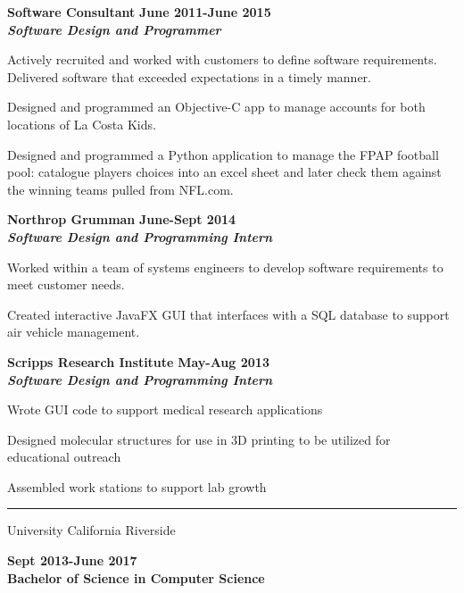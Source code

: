 \documentclass[10pt]{article}
\newcommand{\thing}[1][]{\item #1}
\newcommand{\sectionheader}[1]{
    \vspace{3pt}
    \StrSplit{#1}{3}{\firstpart}{\lastpart} %

    \makebox[0pt][l]{\textbf{\LARGE\firstpart\lastpart}}%
    \rule[-1ex]{\columnwidth}{.1pt}

}
\newcommand{\dates}[2]{
    \textbf{#1-#2}
}
\begin{document}
    \textbf{\large Software Consultant} \hfill \dates{June 2011}{June 2015}\\
    \textit{\textbf{Software Design and Programmer}}
    \begin{things}
        \thing Actively recruited and worked with customers to define
                software requirements. Delivered software that exceeded
                expectations in a timely manner.
        \thing Designed and programmed an Objective-C app to manage
                accounts for both locations of La Costa Kids.
        \thing Designed and programmed a Python application to manage
                the FPAP football pool: catalogue players choices
                into an excel sheet and later check them against the
                winning teams pulled from NFL.com.
    \end{things}

    \textbf{\large Northrop Grumman} \hfill \dates{June}{Sept 2014}\\
    \textit{\textbf{Software Design and Programming Intern}}
    \begin{things}
        \thing Worked within a team of systems engineers to develop
                software requirements to meet customer needs.
        \thing Created interactive JavaFX GUI that interfaces with a
                SQL database to support air vehicle management.
    \end{things}


    \textbf{\large Scripps Research Institute} \hfill \dates{May}{Aug 2013}\\
    \textit{\textbf{Software Design and Programming Intern}}
    \begin{things}
        \thing Wrote GUI code to support medical research applications
        \thing Designed molecular structures for use in 3D printing
                to be utilized for educational outreach
        \thing Assembled work stations to support lab growth
    \end{things}
    
    \sectionheader{Education}
    University California Riverside \hfill %
    \dates{Sept 2013}{June 2017}\\
    \textbf{Bachelor of Science in Computer Science}

\end{document}
